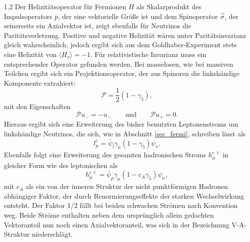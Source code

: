 \documentclass[11pt,a4paper,twoside]{report}
\begin{document}
\begin{spacing}{1,2}
Der Helizitätsoperator für Fermionen $H$ als Skalarprodukt des Impulsoperators $\bar p$, der eine vektorielle Größe ist und dem Spinoperator $\vec \sigma$, 
der seinerseits ein Axialvektor ist, zeigt ebenfalls für Neutrinos die Paritätsverletzung. Positive und negative Helizität wären unter
Paritätsinvarianz gleich wahrscheinlich, jedoch ergibt sich aus dem Goldhaber-Experiment stets eine Helizität von $\langle H_\nu \rangle= -1$. Für relativistische
Invarianz muss ein entsprechender Operator gefunden werden. Bei masselosen, wie bei massiven Teilchen ergibt sich ein Projektionsoperator, der aus Spinoren 
die linkshändige Komponente extrahiert:
\begin{equation}
 \mathcal{P} = \frac12(1-\gamma_5),
\end{equation}
mit den Eigenschaften
\begin{equation}
 \mathcal{P}u_- = -u_- \qquad \text{und}\qquad \mathcal{P}u_+ = 0.
\end{equation}
Hieraus ergibt sich eine Erweiterung des bisher benutzten Leptonenstroms um linkshändige Neutrinos, die sich, wie in Abschnitt \ref{sec_fermi}, schreiben lässt als
\begin{equation}
 l_\mu^c = \bar \psi_l \gamma_\mu (1-\gamma_5) \psi_\nu.
\end{equation}
Ebenfalls folgt eine Erweiterung des gesamten hadronischen Stroms $h_\mu^{c\,\dagger}$ in gleicher Form wie des leptonischen als
\begin{equation}
 h_\mu^{c\,\dagger} = \bar \psi_p \gamma_\mu(1-c_A\gamma_5)\psi_n,
\end{equation}
mit $c_A$ als ein von der inneren Struktur der nicht punktförmigen Hadronen abhängiger Faktor, der durch Renormierungseffekte der starken Wechselwirkung entsteht.
Der Faktor 1/2 fällt bei beiden schwachen Strömen nach Konvention weg. 
Beide Ströme enthalten neben dem ursprünglich allein gedachten Vektoranteil nun noch einen Axialvektoranteil, was sich in der Bezeichnung V-A-Struktur
niederschlägt.


\end{spacing}
\end{document}
